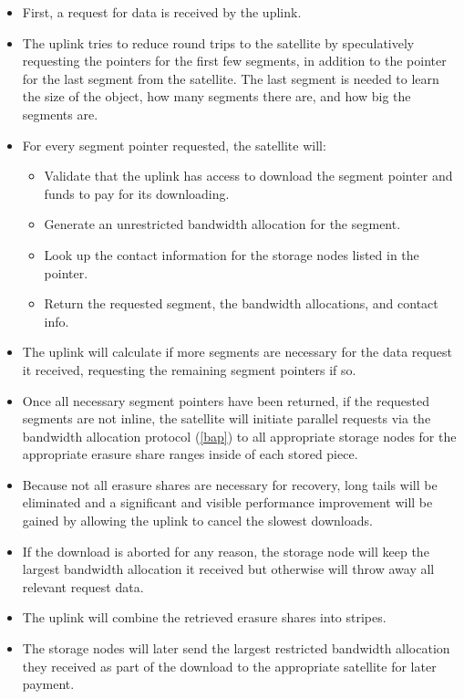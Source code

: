 \documentclass[11pt,fleqn,openany]{book}
\begin{document}
\begin{itemize}
\item First, a request for data is received by the uplink.
\item The uplink tries to reduce round trips to the satellite
  by speculatively requesting the pointers for the first few segments, in
  addition to the pointer for the last segment from the satellite. The last
  segment is needed to learn the size of the object, how many segments
  there are, and how big the segments are.
\item For every segment pointer requested, the satellite will:
  \begin{itemize}
  \item Validate that the uplink has access to download the segment pointer
    and funds to pay for its downloading.
  \item Generate an unrestricted bandwidth allocation for the segment.
  \item Look up the contact information for the storage nodes listed in the
  pointer.
  \item Return the requested segment, the bandwidth allocations, and contact
    info.
  \end{itemize}
\item The uplink will calculate if more segments are necessary for the
  data request it received, requesting the remaining segment pointers if so.
\item Once all necessary segment pointers have been returned, if the requested
  segments are not inline, the satellite will initiate parallel requests
  via the bandwidth allocation protocol (\ref{bap}) to all appropriate storage
  nodes for the appropriate erasure share ranges inside of each stored piece.
\item Because not all erasure shares are necessary for recovery, long tails
  will be eliminated and a significant and visible performance improvement will
  be gained by allowing the uplink to cancel the slowest downloads.
\item If the download is aborted for any reason, the storage node will keep the
  largest bandwidth allocation it received but otherwise will throw away all
  relevant request data.
\item The uplink will combine the retrieved erasure shares into stripes.
\item The storage nodes will later send the largest restricted
  bandwidth allocation they received as part of the download to the appropriate
  satellite for later payment.
\end{itemize}
\end{document}
